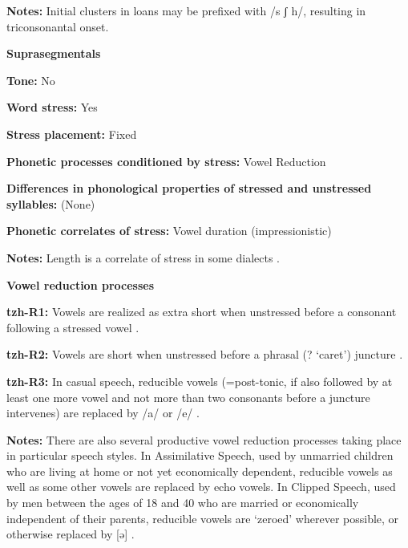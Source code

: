 \textbf{Notes:} Initial clusters in  loans may be prefixed with /s ʃ h/, resulting in triconsonantal onset.



\textbf{Suprasegmentals}



\textbf{Tone:} No



\textbf{Word stress:} Yes



\textbf{Stress placement:} Fixed



\textbf{Phonetic processes conditioned by stress:} Vowel Reduction



\textbf{Differences in phonological properties of stressed and unstressed syllables:} (None)



\textbf{Phonetic correlates of stress:} Vowel duration (impressionistic)



\textbf{Notes:} Length is a correlate of stress in some dialects \citep[23]{Polian2006}.



\textbf{Vowel reduction processes}



\textbf{tzh-R1:} Vowels are realized as extra short when unstressed before a consonant following a stressed vowel \citep[12]{Kaufman1971}.



\textbf{tzh-R2:} Vowels are short when unstressed before a phrasal (? ‘caret’) juncture \citep[12]{Kaufman1971}.



\textbf{tzh-R3:} In casual speech, reducible vowels (=post-tonic, if also followed by at least one more vowel and not more than two consonants before a juncture intervenes) are replaced by /a/ or /e/ \citep[26-7]{Kaufman1971}.



\textbf{Notes:} There are also several productive vowel reduction processes taking place in particular speech styles. In Assimilative Speech, used by unmarried children who are living at home or not yet economically dependent, reducible vowels as well as some other vowels are replaced by echo vowels. In Clipped Speech, used by men between the ages of 18 and 40 who are married or economically independent of their parents, reducible vowels are ‘zeroed’ wherever possible, or otherwise replaced by [ə] \citep[26-7]{Kaufman1971}.



